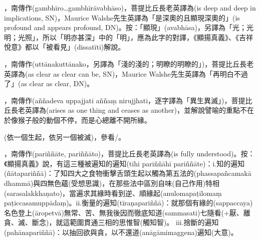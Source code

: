 \startitemgroup[noteitems]
\item{}，南傳作(gambhīro…gambhīrāvabhāso)，菩提比丘長老英譯為(is deep and deep in implications, SN)，Maurice Walshe先生英譯為「是深奧的且顯現深奧的」(is profound and appears profound, DN)。按：「顯現」(avabhāsa)，另譯為「光；光明；光照」，所以「明亦甚深」中的「明」，應為此字的對譯，《顯揚真義》、《吉祥悅意》都以「被看見」(dissatīti)解說。
\stopitemgroup

\startitemgroup[noteitems]
\item{}，南傳作(uttānakuttānako，另譯為「淺的淺的；明瞭的明瞭的」)，菩提比丘長老英譯為(as clear as clear can be, SN)，Maurice Walshe先生英譯為「再明白不過了」(as clear as clear, DN)。
\stopitemgroup

\startitemgroup[noteitems]
\item{}，南傳作(aññadeva uppajjati aññaṃ nirujjhati，逐字譯為「異生異滅」)，菩提比丘長老英譯為(arises as one thing and ceases as another)，並解說譬喻的重點不在於像猴子般的動個不停，而是心總離不開所緣。
\stopitemgroup

\startitemgroup[noteitems]
\item{}(依一個生起，依另一個被滅)，參看/。
\stopitemgroup

\startitemgroup[noteitems]
\item{}，南傳作(pariññāte, pariññāto)，菩提比丘長老英譯為(is fully understood)。按：《顯揚真義》說，有這三種被遍知的遍知(tīhi pariññāhi pariññāte)：i.知的遍知(ñātapariññā)：了知四大之食物衝擊舌頭生起以觸為第五法的(phassapañcamakā dhammā)與四無色蘊(受想思識)，在那些法中區別自味(自己作用)特相(sarasalakkhaṇato)，當遍求其緣時看到逆、順緣起(anulomapaṭilomaṃ paṭiccasamuppādaṃ)。ii.衡量的遍知(tīraṇapariññā)：就那個有緣的(sappaccaya)名色登上(āropetvā)無常、苦、無我後因而徹底知道(sammasati)七隨看(+厭、離貪、滅、斷念)，就這範圍貫通三相的思惟智(觸知智)。 iii.捨斷的遍知(pahānapariññā)：以抽回欲與貪，以不還道(anāgāmimaggena)遍知(大意)。
\stopitemgroup

